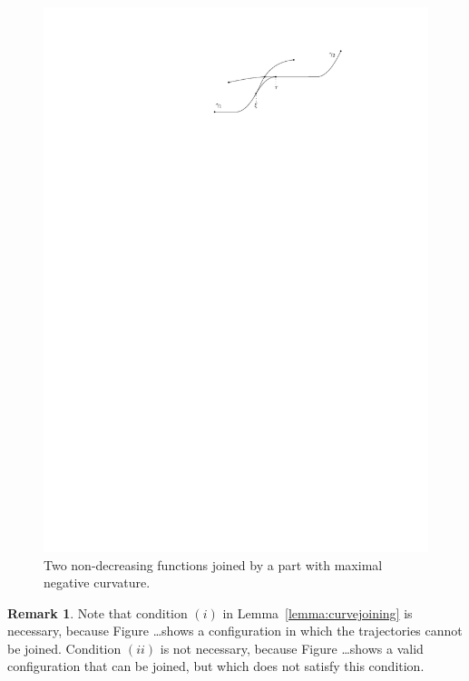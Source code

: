 \documentclass[a4paper]{article}
\theoremstyle{definition}
\newtheorem{remark}{Remark}
\theoremstyle{plain}
\begin{document}
\begin{figure}
  \centering
  \includegraphics[scale=1]{figures/motion/rough/curvejoining}
  \caption{Two non-decreasing functions joined by a part with maximal negative
    curvature.}%
  \label{fig:curvejoining}
\end{figure}

\begin{remark}
  Note that condition $(i)$ in Lemma~\ref{lemma:curvejoining} is necessary, because Figure \dots shows
  a configuration in which the trajectories cannot be joined. Condition $(ii)$
  is not necessary, because Figure \dots shows a valid configuration that can be
  joined, but which does not satisfy this condition.
\end{remark}
\end{document}
